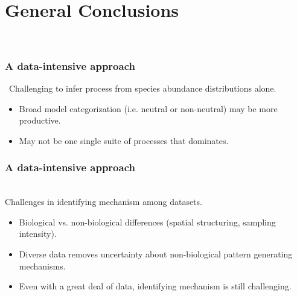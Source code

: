 \documentclass[14pt]{beamer}
\begin{document}
\section{General Conclusions}
\begin{frame}{}
~\\ 
\frametitle{A data-intensive approach}\
Challenging to infer process from species abundance distributions alone.
~\\ 
\begin{itemize}
\item Broad model categorization (i.e. neutral or non-neutral) may be more productive.
\item May not be one single suite of processes that dominates.
\end{itemize} 
\end{frame}

\begin{frame}[t]{}
\frametitle{A data-intensive approach}\
~\\ 
Challenges in identifying mechanism among datasets.
~\\ 
\begin{itemize}
\item Biological vs. non-biological differences (spatial structuring, sampling intensity).
\item Diverse data removes uncertainty about non-biological pattern generating mechanisms.
\item Even with a great deal of data, identifying mechanism is still challenging.
\end{itemize} 
\end{frame}

\end{document}
